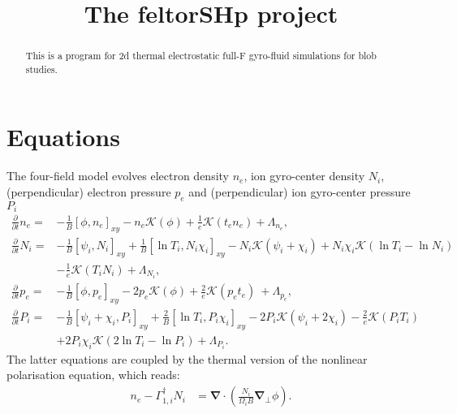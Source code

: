 \documentclass{hitec} %
\renewcommand{\vec}[1]{\boldsymbol{#1}}
\begin{document}
\title{The feltorSHp project}
\maketitle

\begin{abstract}
This is a program for 2d thermal electrostatic full-F gyro-fluid simulations for blob studies.
\end{abstract}

\section{Equations}
The four-field model evolves electron density 
\(n_e\), ion gyro-center density \(N_i\), (perpendicular) electron pressure \(p_e\) and (perpendicular) ion gyro-center pressure \(P_i\)
\begin{align}
\label{eq:dtne}
\frac{\partial}{\partial t} n_e =&-
\frac{1}{B} \left[\phi,n_e \right]_{x y} - n_e \mathcal{K}\left(\phi \right) + \frac{1}{e} \mathcal{K}\left(t_{e} n_e \right) +  \Lambda_{n_e}, 
 \\
\label{eq:dtNi}
\frac{\partial}{\partial t} N_i =&
-\frac{1}{B} \left[\psi_i,N_i \right]_{x y} 
+\frac{1}{B} \left[\ln T_{i},N_i \chi_i \right]_{x y} - N_i \mathcal{K}\left(\psi_i + \chi_i\right) 
+ N_i \chi_i \mathcal{K}\left(\ln T_{i} -  \ln N_i \right) \nonumber \\ 
&
- \frac{1}{e} \mathcal{K}\left(T_{i} N_i \right) 
+  \Lambda_{N_i} , \\
\label{eq:dtpe}
     \frac{\partial }{\partial t}   p_e  =&
          -  \frac{1}{B} \left[\phi ,p_e\right]_{xy}  
          - 2 p_e \mathcal{K}(\phi ) 
          + \frac{2 }{e}\mathcal{K}(p_e t_e )\
          + \Lambda_{p_e}  ,
   \\
   \label{eq:dtPi}
     \frac{\partial }{\partial t}   P_i  =&
          -  \frac{1}{B} \left[\psi_i + \chi_i,P_i\right]_{xy} 
          + \frac{2}{B} \left[\ln T_i, P_i \chi_i \right]_{xy}  - 2 P_i \mathcal{K}(\psi_i + 2\chi_i) 
          - \frac{2 }{e}\mathcal{K}(P_i T_i )\nonumber \\ 
         &+2 P_i \chi_i \mathcal{K}(2\ln T_i - \ln P_i )   
          + \Lambda_{P_i}  .
\end{align}
The latter equations are coupled by the thermal version of the nonlinear polarisation equation, which reads:
\begin{align}
  n_e -\Gamma_{1,i}^\dagger N_i &= \vec{\nabla} \cdot\left(\frac{N_i}{\Omega_i B} \vec{\nabla}_\perp \phi\right).
\end{align}
\end{document}
